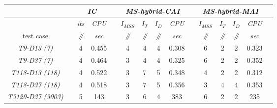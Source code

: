 \begin{table}[h]
\begin{adjustbox}{width=1\textwidth}
\begin{tabular}{@{}l c cc c  cccc c cccc c  @{}}
\toprule 
\end{tabular}
\end{adjustbox}
\begin{adjustbox}{width=1\textwidth} %
\small
\begin{tabular}{@{}l c cc c  cccc c cccc c  @{}}\toprule
                               && \multicolumn{2}{c}{\textit{IC}} &&     \multicolumn{4}{c}{\textit{MS-hybrid-CAI}} && \multicolumn{4}{c}{\textit{MS-hybrid-MAI}} \\ \midrule 
\multicolumn{1}{l}{}        && \textit{its}      & \textit{CPU} && $I_{MSS}$      & $I_T$   &  $I_D$      & \textit{CPU}     &&$I_{MSS}$      & $I_T$   &  $I_D$      & \textit{CPU}      \\
\cmidrule{3-4}  \cmidrule{6-9}  \cmidrule{11-14}   
\multicolumn{1}{c}{test case}      && \textit{\#}       & \textit{sec} && \textit{\#}      & \textit{\#}    & \textit{\#}       & \textit{sec}     && \textit{\#}        & \textit{\#}     &  \textit{\#}       & \textit{sec}  \\
\midrule
\multicolumn{1}{c}{\textit{T9-D13 (7)}}          && 4 & {0.455 } && 4      & 4  & 4 & 0.308 && 6     & 2  & 2 & 0.323  \\
\multicolumn{1}{c}{\textit{T9-D37 (7)}}          && 4 & 0.464    && 3      & 4  & 4 & 0.325 && 6     & 2  & 2 & 0.352  \\
\multicolumn{1}{c}{{\textit{T118-D13 (118)}}}    && 4 & 0.522    && 3      & 7  & 5 & 0.348 && 4     & 2  & 2 & {0.312} \\
\multicolumn{1}{c}{{\textit{T118-D37 (118)}}}    && 4 & 0.518    && 3      & 7  & 5 & 0.356 && 3     & 4  & 4 & {0.353}\\
\multicolumn{1}{c}{{\textit{T3120-D37 (3003)}}}  && 5 & 143      && 3      & 6  & 4 & 383   && 6     & 2  & 2 & {235}  \\
\toprule 
\end{tabular}
\end{adjustbox}
\end{table}